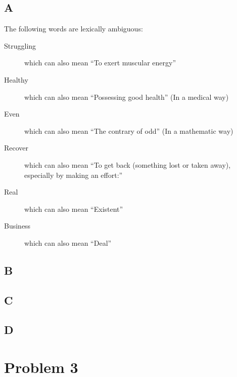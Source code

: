 \documentclass{article}
\begin{document}
        \subsection{A}
            The following words are lexically ambiguous:
            \begin{description}
                \item[Struggling] which can also mean ``To exert muscular energy''
                \item[Healthy] which can also mean ``Possessing good health'' (In a medical way)
                \item[Even] which can also mean ``The contrary of odd'' (In a mathematic way)
                \item[Recover] which can also mean ``To get back (something lost or taken away), especially by making an effort:''
                \item[Real] which can also mean ``Existent''
                \item[Business] which can also mean ``Deal''
            \end{description}
        \subsection{B}
        \subsection{C}
        \subsection{D}
    \newpage
    \section{Problem 3}
\end{document}
